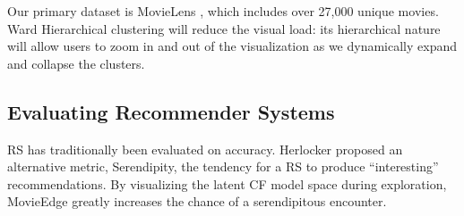 Our primary dataset is MovieLens \cite{harper2016movielens}, which includes over 27,000 unique movies. Ward Hierarchical clustering \cite{ward1963hierarchical} will reduce the visual load:  its hierarchical nature will allow users to zoom in and out of the visualization as we dynamically expand and collapse the clusters.

\subsection{Evaluating Recommender Systems}

RS has traditionally been evaluated on accuracy. Herlocker \cite{herlocker2004evaluating} proposed an alternative metric, Serendipity, the tendency for a RS to produce  “interesting” recommendations. By visualizing the latent CF model space during exploration, MovieEdge greatly increases the chance of a serendipitous encounter.
